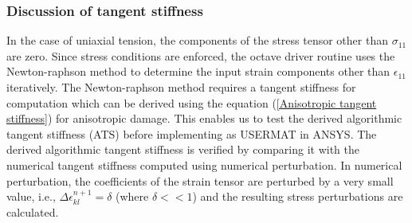 \documentclass[12pt,openright,twoside]{report}
\begin{document}
\subsubsection{Discussion of tangent stiffness}
\indent\indent\indent In the case of uniaxial tension, the components of the stress tensor other than $\sigma_{11}$ are zero. Since stress conditions are enforced, the octave driver routine \citep{codes} uses the Newton-raphson method to determine the input strain components other than $\epsilon_{11}$ iteratively. The Newton-raphson method requires a tangent stiffness for computation which can be derived using the equation (\ref{Anisotropic tangent stiffness}) for anisotropic damage. This enables us to test the derived algorithmic tangent stiffness (ATS) before implementing as USERMAT in ANSYS. The derived algorithmic tangent stiffness is verified by comparing it with the numerical tangent stiffness computed using numerical perturbation. In numerical perturbation, the coefficients of the strain tensor are perturbed by a very small value, i.e.,  $\Delta\epsilon_{kl}^{n+1} = \delta$ (where $\delta<<1$) and the resulting stress perturbations are calculated. 
\end{document}

